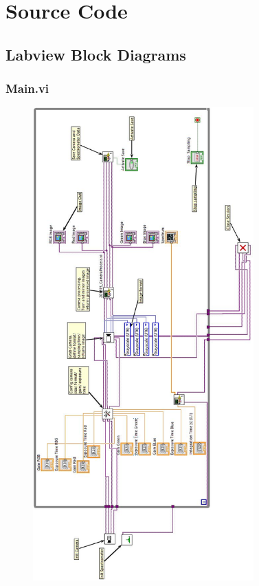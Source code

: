 \chapter{Source Code}
\label{appendixSoureCode}

\section{Labview Block Diagrams}
\subsection{Main.vi}
\begin{figure}[h!]
\begin{center}
\includegraphics[width=8.5cm]{Pictures/AppMainvi}
\end{center}
\end{figure}

\newpage
